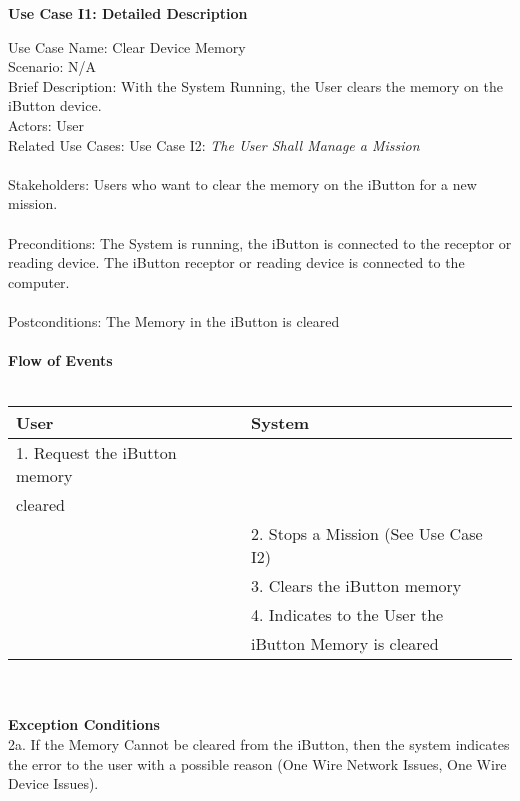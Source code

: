 \documentclass[letterpaper]{article}
\begin{document}
\noindent
\begin{center}
\textbf{Use Case I1:  Detailed Description}
\end{center}
Use Case Name:  Clear Device Memory\\
Scenario:  N/A\\
Brief Description:  With the System Running, the User clears the
memory on the iButton device.\\
Actors:  User\\
Related Use Cases:  Use Case I2:
\textit{The User Shall Manage a Mission}\\\\
Stakeholders:  Users who want to clear the memory on the iButton for
a new mission.\\\\
Preconditions:  The System is running, the iButton is connected to
the receptor or reading device.  The iButton receptor or reading
device is connected to the computer.\\\\
Postconditions:  The Memory in the iButton is cleared\\\\
\textbf{Flow of Events}\\\\
\begin{tabular}{|l|l|}\hline
\textbf{User} & \textbf{System}\\\hline
1.  Request the iButton memory & \\
cleared & \\\hline
 & 2.  Stops a Mission (See Use Case I2)\\\hline
 & 3.  Clears the iButton memory\\\hline
 & 4.  Indicates to the User the \\
 & iButton Memory is cleared\\\hline
\end{tabular}\\\\
\textbf{Exception Conditions}\\
2a.  If the Memory Cannot be cleared from the iButton, then the
system indicates the error to the user with a possible reason
(One Wire Network Issues, One Wire Device Issues).
\end{document}
